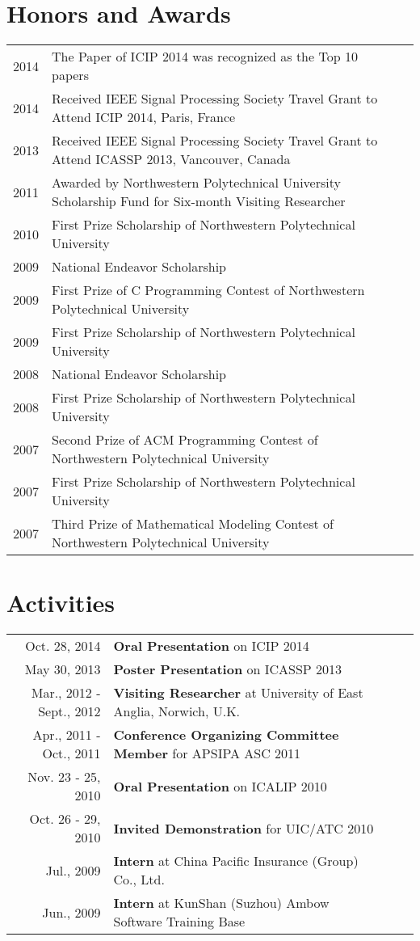 \documentclass[10pt]{article}
\begin{document}
\section{Honors and Awards}
\begin{tabularx}{\textwidth}{@{}r|X l|p{4.9cm}@{}}
2014 & The Paper of ICIP 2014 was recognized as the Top 10 papers \\
2014 & Received IEEE Signal Processing Society Travel Grant to Attend ICIP 2014, Paris, France \\
2013 & Received IEEE Signal Processing Society Travel Grant to Attend ICASSP 2013, Vancouver, Canada \\
2011 & Awarded by Northwestern Polytechnical University Scholarship Fund for Six-month Visiting Researcher \\
2010 & First Prize Scholarship of Northwestern Polytechnical University \\
2009 & National Endeavor Scholarship \\
2009 & First Prize of C Programming Contest of Northwestern Polytechnical University \\
2009 & First Prize Scholarship of Northwestern Polytechnical University \\
2008 & National Endeavor Scholarship \\
2008 & First Prize Scholarship of Northwestern Polytechnical University \\
2007 & Second Prize of ACM Programming Contest of Northwestern Polytechnical University \\
2007 & First Prize Scholarship of Northwestern Polytechnical University \\
2007 & Third Prize of Mathematical Modeling Contest of Northwestern Polytechnical University
\end{tabularx}


\vspace{0.8em}
\section{Activities}
\begin{tabularx}{\textwidth}{@{}r|X l|p{4.9cm}@{}}
Oct. 28, 2014            &  \textbf{Oral Presentation} on ICIP 2014 \\
May 30, 2013             &  \textbf{Poster Presentation} on ICASSP 2013 \\
Mar., 2012 - Sept., 2012 &  \textbf{Visiting Researcher} at University of East Anglia, Norwich, U.K. \\
Apr., 2011 - Oct., 2011  &  \textbf{Conference Organizing Committee Member} for APSIPA ASC 2011 \\
Nov. 23 - 25, 2010       &  \textbf{Oral Presentation} on ICALIP 2010 \\
Oct. 26 - 29, 2010       &  \textbf{Invited Demonstration} for UIC/ATC 2010 \\
Jul., 2009               &  \textbf{Intern} at China Pacific Insurance (Group) Co., Ltd. \\
Jun., 2009               &  \textbf{Intern} at KunShan (Suzhou) Ambow Software Training Base
\end{tabularx}
\end{document}
